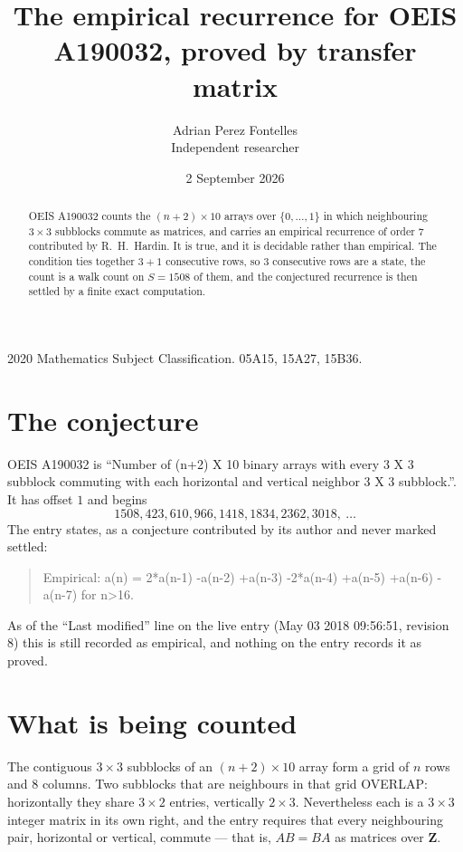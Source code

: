 \documentclass[11pt,a4paper]{article}
\title{The empirical recurrence for OEIS A190032, proved by transfer matrix}
\author{Adrian Perez Fontelles\\ \small Independent researcher}
\date{2 September 2026}
\theoremstyle{plain}
\theoremstyle{definition}
\begin{document}
\maketitle

\begin{abstract}
OEIS A190032 counts the $(n+2)\times10$ arrays over $\{0,\dots,1\}$ in which
neighbouring $3\times3$ subblocks commute as matrices, and carries an empirical
recurrence
of order $7$ contributed by R.~H.~Hardin. It is true, and it is decidable rather than
empirical. The condition ties together $3+1$ consecutive rows, so $3$ consecutive rows are
a state, the count is a walk count on $S=1508$ of them, and the conjectured recurrence is then
settled by a finite exact computation.
\end{abstract}

\noindent\small 2020 Mathematics Subject Classification. 05A15, 15A27, 15B36.\normalsize

\section{The conjecture}

OEIS A190032 is ``Number of (n+2) X 10 binary arrays with every 3 X 3 subblock commuting with each horizontal and vertical neighbor 3 X 3 subblock.''. It has offset $1$ and begins
\[
1508, 423, 610, 966, 1418, 1834, 2362, 3018,\ \dots
\]
The entry states, as a conjecture contributed by its author and never marked settled:
\begin{quote}
Empirical: a(n) = 2*a(n-1) -a(n-2) +a(n-3) -2*a(n-4) +a(n-5) +a(n-6) -a(n-7) for n>16.
\end{quote}
As of the ``Last modified'' line on the live entry (May 03 2018 09:56:51, revision 8) this is still
recorded as empirical, and nothing on the entry records it as proved.

\section{What is being counted}

The contiguous $3\times3$ subblocks of an $(n+2)\times10$ array form a grid of $n$
rows and $8$ columns. Two subblocks that are neighbours in that
grid OVERLAP: horizontally they share $3\times2$ entries, vertically
$2\times3$. Nevertheless each is a $3\times3$ integer matrix in its own right, and
the entry requires that every neighbouring pair, horizontal or vertical, commute --- that is,
$AB=BA$ as matrices over $\mathbf{Z}$.
\end{document}
